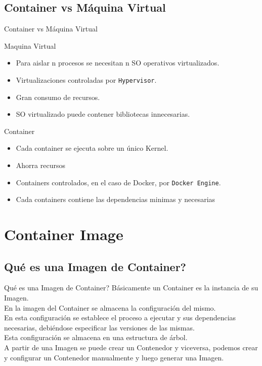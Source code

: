 \documentclass{beamer}
\begin{document}
\subsection{Container vs Máquina Virtual}

\begin{frame}{Container vs Máquina Virtual}

	Maquina Virtual
	\begin{itemize}
	\item
	Para aislar n procesos se necesitan n SO operativos virtualizados.
	\item
	Virtualizaciones controladas por \texttt{Hypervisor}.
	\item 
	Gran consumo de recursos.
	\item
	SO virtualizado puede contener bibliotecas innecesarias.
	\end{itemize}		

	Container
	\begin{itemize}
	\item
	Cada container se ejecuta sobre un único Kernel.
	\item
	Ahorra recursos
	\item
	Containers controlados, en el caso de Docker, por \texttt{Docker Engine}.
	\item
	Cada containers contiene las dependencias minimas y necesarias
	\end{itemize}
\end{frame}

\section{Container Image}

\subsection{Qué es una Imagen de Container?}

\begin{frame}{Qué es una Imagen de Container?}
 	Básicamente un Container es la instancia de su Imagen.\\
	En la imagen del Container se almacena la configuración del mismo.\\
	En esta configuración se establece el proceso a ejecutar y sus dependencias necesarias, debiéndose especificar las versiones de las mismas. \\
	Esta configuración se almacena en una estructura de árbol.\\
	A partir de una Imagen se puede crear un Contenedor y viceversa, podemos crear y configurar un Contenedor manualmente y luego generar una Imagen. \\
\end{frame}
\end{document}
